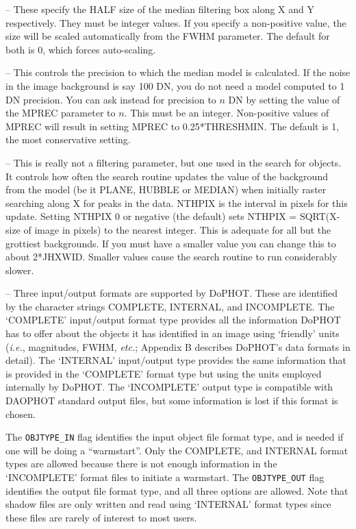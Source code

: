  --  These specify the HALF size of the median
filtering box along X and Y respectively. They must be integer values.
If you specify a non-positive value, the size will be scaled
automatically from the FWHM parameter.
The default for both is 0, which forces auto-scaling.

 --  This controls the precision to which 
the median model is
calculated. If the noise in the image background is say 100 DN, you do 
not need a model computed to 1 DN precision. 
You can ask instead for precision to $n$ DN by setting the value of the
MPREC parameter to $n$. This must be an integer. 
Non-positive values of MPREC will result in 
setting MPREC to 0.25*THRESHMIN.
The default is 1, the most conservative setting.

 -- This is really not a filtering parameter, 
but one used in 
the search for objects. It controls how often the search routine updates
the value of the background from the model (be it PLANE, HUBBLE or
MEDIAN) when initially raster searching along X for peaks 
in the data. NTHPIX is the 
interval in pixels for this update. Setting NTHPIX 0 or negative (the
default) sets NTHPIX = SQRT(X-size of image in pixels) to the nearest
integer. This is adequate for all but the grottiest backgrounds.
If you must have a smaller value you can change this to about 2*JHXWID.
Smaller values cause the search routine to run considerably slower.

 -- Three input/output formats are
supported by DoPHOT.  These are identified by the character
strings COMPLETE, INTERNAL, and INCOMPLETE.  The `COMPLETE' input/output
format type provides all the information DoPHOT has to offer about the
objects it has identified in an image using `friendly' units ({\it i.e.},
magnitudes, FWHM, {\it etc.}; Appendix B describes DoPHOT's data formats
in detail).  The 
`INTERNAL' input/output type provides the same information that is
provided in the `COMPLETE' format type but using the 
units employed internally by DoPHOT.
The `INCOMPLETE' output type is
compatible with DAOPHOT standard output files, but some information 
is lost if this format is chosen.  

The {\tt OBJTYPE\_IN}
flag identifies the input object file format type, and is needed if one
will be doing a ``warmstart''.
Only the COMPLETE, and INTERNAL format
types are allowed because there is not enough information in 
the  `INCOMPLETE' format files to initiate a warmstart.  The
{\tt OBJTYPE\_OUT} flag identifies the output file format type, and
all three options are allowed.  Note that shadow files 
are only written and read using `INTERNAL' format types
since these files are rarely of interest to most users.

